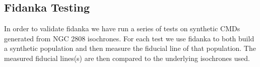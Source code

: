 \subsection{Fidanka Testing}
In order to validate fidanka we have run a series of tests on synthetic CMDs
generated from NGC 2808 isochrones. For each test we use fidanka to both build
a synthetic population and then measure the fiducial line of that population.
The measured fiducial lines(s) are then compared to the underlying isochrones
used.

